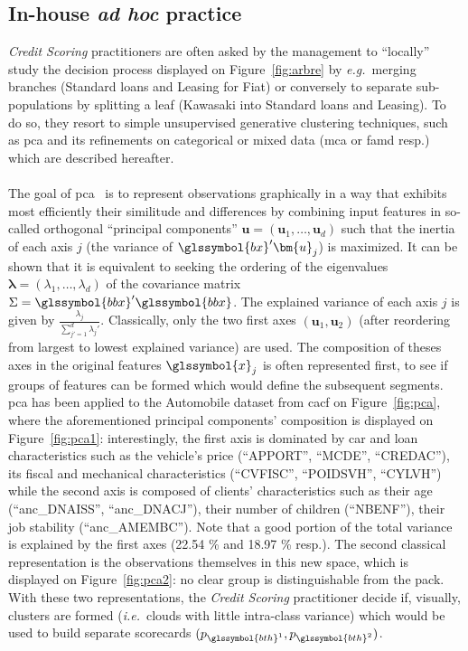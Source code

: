 \subsection{In-house \textit{ad hoc} practice} \label{subsec:adhoc}

\textit{Credit Scoring} practitioners are often asked by the management to ``locally'' study the decision process displayed on Figure~\ref{fig:arbre} by \textit{e.g.}\ merging branches (Standard loans and Leasing for Fiat) or conversely to separate sub-populations by splitting a leaf (Kawasaki into Standard loans and Leasing). To do so, they resort to simple unsupervised generative clustering techniques, such as \gls{pca} and its refinements on categorical or mixed data (\gls{mca} or \gls{famd} resp.) which are described hereafter.

\paragraph{}

The goal of \gls{pca}~\cite{pages2014multiple} is to represent observations graphically in a way that exhibits most efficiently their similitude and differences by combining input features in so-called orthogonal ``principal components'' $\bm{u} = (\bm{u}_1,\dots,\bm{u}_d)$ such that the inertia of each axis $j$ (the variance of $\glssymbol{bx}' \bm{u}_j$) is maximized. It can be shown that it is equivalent to seeking the ordering of the eigenvalues $\bm{\lambda} = (\lambda_1,\dots,\lambda_d)$ of the covariance matrix $\Sigma = \glssymbol{bbx}'\glssymbol{bbx}$. The explained variance of each axis $j$ is given by $\frac{\lambda_j}{\sum_{j'=1}^d \lambda_j'}$. Classically, only the two first axes $(\bm{u}_1,\bm{u}_2)$ (after reordering from largest to lowest explained variance) are used. The composition of theses axes in the original features $\glssymbol{x}_j$ is often represented first, to see if groups of features can be formed which would define the subsequent segments. \gls{pca} has been applied to the Automobile dataset from \gls{cacf} on Figure~\ref{fig:pca}, where the aforementioned principal components' composition is displayed on Figure~\ref{fig:pca1}: interestingly, the first axis is dominated by car and loan characteristics such as the vehicle's price (``APPORT'', ``MCDE'', ``CREDAC''), its fiscal and mechanical characteristics (``CVFISC'', ``POIDSVH'', ``CYLVH'') while the second axis is composed of clients' characteristics such as their age (``anc\_DNAISS'', ``anc\_DNACJ''), their number of children (``NBENF''), their job stability (``anc\_AMEMBC''). Note that a good portion of the total variance is explained by the first axes (22.54 \% and 18.97 \% resp.). The second classical representation is the observations themselves in this new space, which is displayed on Figure~\ref{fig:pca2}: no clear group is distinguishable from the pack. With these two representations, the \textit{Credit Scoring} practitioner decide if, visually, clusters are formed (\textit{i.e.}\ clouds with little intra-class variance) which would be used to build separate scorecards $(p_{\glssymbol{bth}^{1}},p_{\glssymbol{bth}^{2}})$.

